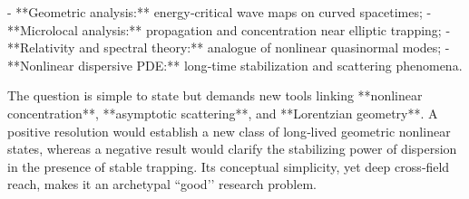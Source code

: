 - **Geometric analysis:** energy‑critical wave maps on curved spacetimes;  
- **Microlocal analysis:** propagation and concentration near elliptic trapping;  
- **Relativity and spectral theory:** analogue of nonlinear quasinormal modes;  
- **Nonlinear dispersive PDE:** long‑time stabilization and scattering phenomena.

The question is simple to state but demands new tools linking **nonlinear concentration**, **asymptotic scattering**, and **Lorentzian geometry**. A positive resolution would establish a new class of long‑lived geometric nonlinear states, whereas a negative result would clarify the stabilizing power of dispersion in the presence of stable trapping.  
Its conceptual simplicity, yet deep cross‑field reach, makes it an archetypal “good’’ research problem.